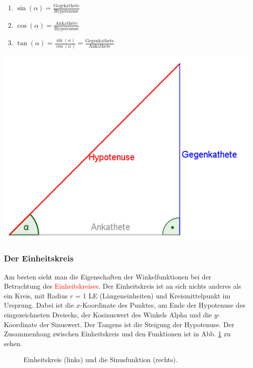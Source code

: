 \begin{minipage}{0.45\textwidth}
\hfill
\begin{enumerate}
\item $\sin(\alpha)=\frac{\text{Gegekathete}}{\text{Hypotenuse}}$
\item $\cos(\alpha)=\frac{\text{Ankathete}}{\text{Hypotenuse}}$
\item $\tan(\alpha)=\frac{\sin(\alpha)}{\cos(\alpha)}= \frac{\text{Gegenkathete}}{\text{Ankathete}}$
\end{enumerate}
\end{minipage}
\begin{minipage}{0.45\textwidth}
\includegraphics[width=1.0\textwidth]{pictures/TrigonDreieck}
\end{minipage}

\subsubsection{Der Einheitskreis}
Am besten sieht man die Eigenschaften der Winkelfunktionen bei der Betrachtung des \textcolor{red}{Einheitskreises}. Der Einheitskreis ist an sich nichts anderes als ein Kreis, mit Radius $r$ = 1 LE (Längeneinheiten) und Kreismittelpunkt im Ursprung. Dabei ist die $x$-Koordinate des Punktes, am Ende der Hypotenuse des eingezeichneten Dreiecks, der Kosinuswert des Winkels Alpha und die $y$-Koordinate der Sinuswert. Der Tangens ist die Steigung der Hypotenuse. Der Zusammenhang zwischen Einheitskreis und den Funktionen ist in Abb. \ref{fig:circ} zu sehen.

\begin{figure}[h!]

\caption{Einheitskreis (links) und die Sinusfunktion (rechts).}
\label{fig:circ}
\end{figure}

